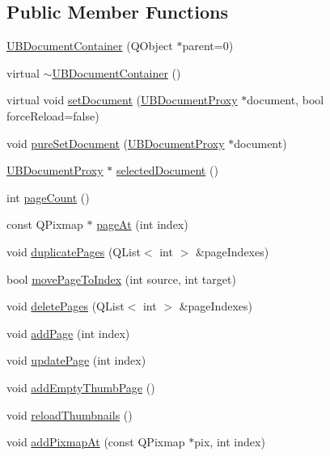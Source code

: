 \subsection*{Public Member Functions}
\begin{DoxyCompactItemize}
\item 
\hyperlink{class_u_b_document_container_a5849f5f460c00d25d5a07f99bfb4a973}{U\-B\-Document\-Container} (Q\-Object $\ast$parent=0)
\item 
virtual \hyperlink{class_u_b_document_container_aacc0d4da4023820be7b698a80a1f85c8}{$\sim$\-U\-B\-Document\-Container} ()
\item 
virtual void \hyperlink{class_u_b_document_container_af4ec175500cc0917a65d77f50b2ddca5}{set\-Document} (\hyperlink{class_u_b_document_proxy}{U\-B\-Document\-Proxy} $\ast$document, bool force\-Reload=false)
\item 
void \hyperlink{class_u_b_document_container_a208962cdcfaa530274878bf956c41828}{pure\-Set\-Document} (\hyperlink{class_u_b_document_proxy}{U\-B\-Document\-Proxy} $\ast$document)
\item 
\hyperlink{class_u_b_document_proxy}{U\-B\-Document\-Proxy} $\ast$ \hyperlink{class_u_b_document_container_a859116555c2e46b6949e6e1cc613d754}{selected\-Document} ()
\item 
int \hyperlink{class_u_b_document_container_ae84266eece665659405100eaf4e7d8d0}{page\-Count} ()
\item 
const Q\-Pixmap $\ast$ \hyperlink{class_u_b_document_container_a4482fb1ef69c93fca33e2fb69d5e40b7}{page\-At} (int index)
\item 
void \hyperlink{class_u_b_document_container_aedf080a092dceadc66b0994b0bf156fe}{duplicate\-Pages} (Q\-List$<$ int $>$ \&page\-Indexes)
\item 
bool \hyperlink{class_u_b_document_container_a4deb511d6a7b576f325daf8aea188f54}{move\-Page\-To\-Index} (int source, int target)
\item 
void \hyperlink{class_u_b_document_container_a156ab898f2b4ff3f12f1e6d5e3406a69}{delete\-Pages} (Q\-List$<$ int $>$ \&page\-Indexes)
\item 
void \hyperlink{class_u_b_document_container_a8695e1fb7c34671938ee814f1e7d4896}{add\-Page} (int index)
\item 
void \hyperlink{class_u_b_document_container_a79fc0149f295d96c4569bceffc768ccf}{update\-Page} (int index)
\item 
void \hyperlink{class_u_b_document_container_a860b8b8e9223763778c6980b1fe472b2}{add\-Empty\-Thumb\-Page} ()
\item 
void \hyperlink{class_u_b_document_container_ac3272d2665550f16f671697a428d444a}{reload\-Thumbnails} ()
\item 
void \hyperlink{class_u_b_document_container_adecbcbc796b785480167416fe955a597}{add\-Pixmap\-At} (const Q\-Pixmap $\ast$pix, int index)
\end{DoxyCompactItemize}
